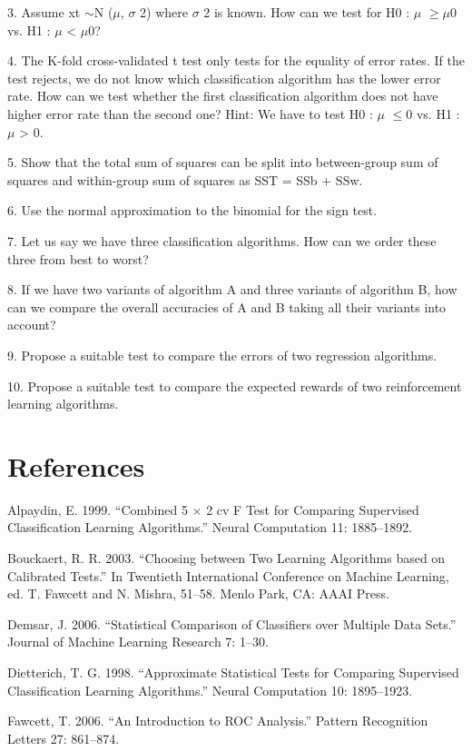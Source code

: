 3. Assume xt $\sim$N ($\mu$, $\sigma$ 2) where $\sigma$ 2 is known. How can we test for H0 : $\mu$ $\geq$$\mu$0 vs. H1 : $\mu$ < $\mu$0?

4. The K-fold cross-validated t test only tests for the equality of error rates. If the test rejects, we do not know which classification algorithm has the lower error rate. How can we test whether the first classification algorithm does not have higher error rate than the second one? Hint: We have to test H0 : $\mu$ $\leq$0 vs. H1 : $\mu$ > 0.

5. Show that the total sum of squares can be split into between-group sum of squares and within-group sum of squares as SST = SSb + SSw.

6. Use the normal approximation to the binomial for the sign test.

7. Let us say we have three classification algorithms. How can we order these three from best to worst?

8. If we have two variants of algorithm A and three variants of algorithm B, how can we compare the overall accuracies of A and B taking all their variants into account?

9. Propose a suitable test to compare the errors of two regression algorithms.

10. Propose a suitable test to compare the expected rewards of two reinforcement learning algorithms.

\section{References}

Alpaydin, E. 1999. “Combined 5 $\times$ 2 cv F Test for Comparing Supervised Classification Learning Algorithms.” Neural Computation 11: 1885--1892.

Bouckaert, R. R. 2003. “Choosing between Two Learning Algorithms based on Calibrated Tests.” In Twentieth International Conference on Machine Learning, ed. T. Fawcett and N. Mishra, 51--58. Menlo Park, CA: AAAI Press.

Demsar, J. 2006. “Statistical Comparison of Classifiers over Multiple Data Sets.” Journal of Machine Learning Research 7: 1--30.

Dietterich, T. G. 1998. “Approximate Statistical Tests for Comparing Supervised Classification Learning Algorithms.” Neural Computation 10: 1895--1923.

Fawcett, T. 2006. “An Introduction to ROC Analysis.” Pattern Recognition Letters 27: 861--874.


